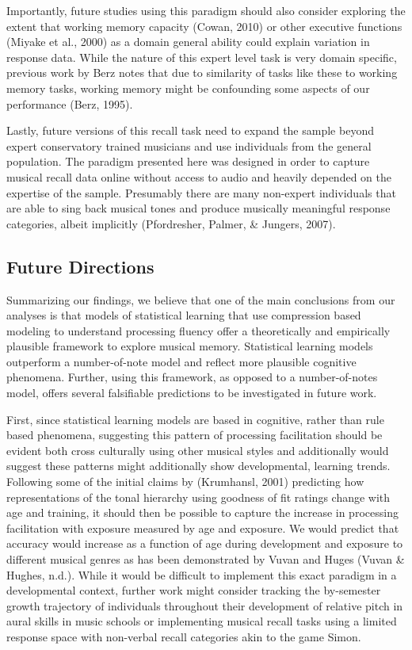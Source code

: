 \documentclass[english,man,floatsintext]{apa6}
\begin{document}
Importantly, future studies using this paradigm should also consider exploring the extent that working memory capacity (Cowan, 2010) or other executive functions (Miyake et al., 2000) as a domain general ability could explain variation in response data.
While the nature of this expert level task is very domain specific, previous work by Berz notes that due to similarity of tasks like these to working memory tasks, working memory might be confounding some aspects of our performance (Berz, 1995).

Lastly, future versions of this recall task need to expand the sample beyond expert conservatory trained musicians and use individuals from the general population.
The paradigm presented here was designed in order to capture musical recall data online without access to audio and heavily depended on the expertise of the sample.
Presumably there are many non-expert individuals that are able to sing back musical tones and produce musically meaningful response categories, albeit implicitly (Pfordresher, Palmer, \& Jungers, 2007).

\hypertarget{future-directions}{%
\subsection{Future Directions}\label{future-directions}}

Summarizing our findings, we believe that one of the main conclusions from our analyses is that models of statistical learning that use compression based modeling to understand processing fluency offer a theoretically and empirically plausible framework to explore musical memory.
Statistical learning models outperform a number-of-note model and reflect more plausible cognitive phenomena.
Further, using this framework, as opposed to a number-of-notes model, offers several falsifiable predictions to be investigated in future work.

First, since statistical learning models are based in cognitive, rather than rule based phenomena, suggesting this pattern of processing facilitation should be evident both cross culturally using other musical styles and additionally would suggest these patterns might additionally show developmental, learning trends.
Following some of the initial claims by (Krumhansl, 2001) predicting how representations of the tonal hierarchy using goodness of fit ratings change with age and training, it should then be possible to capture the increase in processing facilitation with exposure measured by age and exposure.
We would predict that accuracy would increase as a function of age during development and exposure to different musical genres as has been demonstrated by Vuvan and Huges (Vuvan \& Hughes, n.d.).
While it would be difficult to implement this exact paradigm in a developmental context, further work might consider tracking the by-semester growth trajectory of individuals throughout their development of relative pitch in aural skills in music schools or implementing musical recall tasks using a limited response space with non-verbal recall categories akin to the game Simon.
\end{document}
